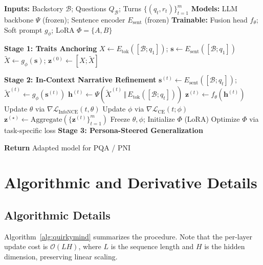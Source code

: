\begin{algorithm}[t]
\small %
\caption{QuirkyMind}%
\label{alg:quirkymind}
\begin{algorithmic}[1]
\State \textbf{Inputs:} Backstory $\mathcal{B}$; Questions $Q_{\mathcal{B}}$; Turns $\{(q_t,r_t)\}_{t=1}^{m}$
\State \textbf{Models:} LLM backbone $\Psi$ (frozen); Sentence encoder $E_{\text{sent}}$ (frozen)
\State \textbf{Trainable:} Fusion head $f_{\theta}$; Soft prompt $g_{\phi}$; LoRA $\Phi=\{A,B\}$

\vspace{0.3em}
\Statex \textbf{Stage 1: Traits Anchoring}
\State $X \gets E_{\text{tok}}([\mathcal{B};q_1])$; \quad $\mathbf{s}\gets E_{\text{sent}}([\mathcal{B};q_1])$
\State $\tilde X \gets g_{\phi}(\mathbf{s})$; \quad $\mathbf{z}^{(0)} \gets [X;\tilde X]$

\vspace{0.3em}
\Statex \textbf{Stage 2: In-Context Narrative Refinement}
  \State $\mathbf{s}^{(t)} \gets E_{\text{sent}}([\mathcal{B};q_t])$; \quad $\tilde X^{(t)} \gets g_{\phi}(\mathbf{s}^{(t)})$
  \State $\mathbf{h}^{(t)} \gets \Psi(\tilde X^{(t)} \,\Vert\, E_{\text{tok}}([\mathcal{B};q_t]))$
  \State $\mathbf{z}^{(t)} \gets f_{\theta}(\mathbf{h}^{(t)})$
  \State Update $\theta$ via $\nabla \mathcal{L}_{\text{InfoNCE}}(t,\theta)$ 
  \State Update $\phi$ via $\nabla \mathcal{L}_{\text{CE}}(t;\phi)$ 
\EndFor
\State $\mathbf{z}^{(\star)} \gets \text{Aggregate}(\{\mathbf{z}^{(t)}\}_{t=1}^{m})$
\State Freeze $\theta, \phi$; Initialize $\Phi$ (LoRA)
\State Optimize $\Phi$ via task-specific loss %
\vspace{0.3em}
\Statex \textbf{Stage 3: Persona-Steered Generalization}

\State \textbf{Return} Adapted model for PQA / PNI
\end{algorithmic}
\end{algorithm}



\section{Algorithmic and Derivative Details}\label{sec: gradient}

\subsection{Algorithmic Details} \label{sec:algo}
Algorithm~\ref{alg:quirkymind} summarizes the procedure. Note that the per-layer update cost is $\mathcal{O}(LH)$, where $L$ is the sequence length and $H$ is the hidden dimension, preserving linear scaling.



